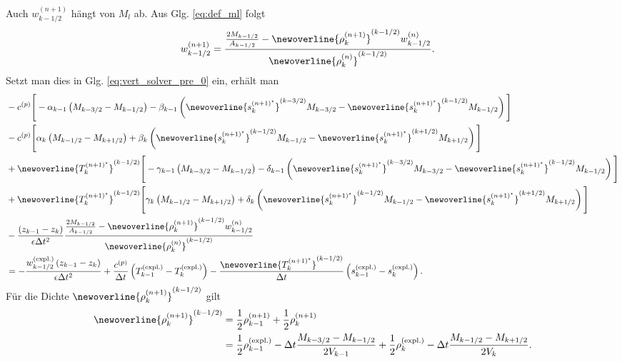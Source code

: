 %
Auch $w_{k - 1/2}^{(n + 1)}$ hängt von $M_l$ ab. Aus Glg. \eqref{eq:def_ml} folgt
%
\begin{align}
w^{(n + 1)}_{k - 1/2} &= \frac{\frac{2M_{k - 1/2}}{A_{k - 1/2}} - \newoverline{\rho_k^{(n + 1)}}^{(k - 1/2)}w^{(n)}_{k - 1/2}}{\newoverline{\rho_k^{(n)}}^{(k - 1/2)}}.\label{eq:w_from_ml}
\end{align}
%
Setzt man dies in Glg. \eqref{eq:vert_solver_pre_0} ein, erhält man
%
\begin{align}
&-c^{(p)}\Bigg[-\alpha_{k - 1}\left(M_{k - 3/2} - M_{k - 1/2}\right) - \beta_{k - 1}\left(\newoverline{s_k^{(n + 1)^\star}}^{(k - 3/2)}M_{k - 3/2} - \newoverline{s_k^{(n + 1)^\star}}^{(k - 1/2)}M_{k - 1/2}\right)\Bigg]\nonumber\\
&-c^{(p)}\Bigg[\alpha_k\left(M_{k - 1/2} - M_{k + 1/2}\right) + \beta_k\left(\newoverline{s_k^{(n + 1)^\star}}^{(k - 1/2)}M_{k - 1/2} - \newoverline{s_k^{(n + 1)^\star}}^{(k + 1/2)}M_{k + 1/2}\right)\Bigg]\nonumber\\
&+ \newoverline{T_k^{(n + 1)^\star}}^{(k - 1/2)}\Bigg[-\gamma_{k - 1}\left(M_{k - 3/2} - M_{k - 1/2}\right) - \delta_{k - 1}\left(\newoverline{s_k^{(n + 1)^\star}}^{(k - 3/2)}M_{k - 3/2} - \newoverline{s_k^{(n + 1)^\star}}^{(k - 1/2)}M_{k - 1/2}\right)\Bigg]\nonumber\\
&+ \newoverline{T_k^{(n + 1)^\star}}^{(k - 1/2)}\Bigg[\gamma_k\left(M_{k - 1/2} - M_{k + 1/2}\right) + \delta_k\left(\newoverline{s_k^{(n + 1)^\star}}^{(k - 1/2)}M_{k - 1/2} - \newoverline{s_k^{(n + 1)^\star}}^{(k + 1/2)}M_{k + 1/2}\right)\Bigg]\nonumber\\
&- \frac{\left(z_{k - 1} - z_k\right)}{\epsilon\Delta t^2}\frac{\frac{2M_{k - 1/2}}{A_{k - 1/2}} - \newoverline{\rho_k^{(n + 1)}}^{(k - 1/2)}w^{(n)}_{k - 1/2}}{\newoverline{\rho_k^{(n)}}^{(k - 1/2)}}\nonumber\\
&= -\frac{w_{k - 1/2}^{(\text{expl.})}\left(z_{k - 1} - z_k\right)}{\epsilon\Delta t^2} + \frac{c^{(p)}}{\Delta t}\left(T^{(\text{expl.})}_{k - 1} - T^{(\text{expl.})}_{k}\right) - \frac{\newoverline{T_k^{(n + 1)^\star}}^{(k - 1/2)}}{\Delta t}\left(s^{(\text{expl.})}_{k - 1} - s^{(\text{expl.})}_k\right).
\end{align}
%
Für die Dichte $ \newoverline{\rho_k^{(n + 1)}}^{(k - 1/2)}$ gilt
%
\begin{align}
\newoverline{\rho_k^{(n + 1)}}^{(k - 1/2)} &= \frac{1}{2}\rho_{k - 1}^{(n + 1)} + \frac{1}{2}\rho_k^{(n + 1)}\nonumber\\
&= \frac{1}{2}\rho_{k - 1}^{(\text{expl.})} - \Delta t\frac{M_{k - 3/2} - M_{k - 1/2}}{2V_{k - 1}} + \frac{1}{2}\rho_k^{(\text{expl.})} - \Delta t\frac{M_{k - 1/2} - M_{k + 1/2}}{2V_k}.
\end{align}
